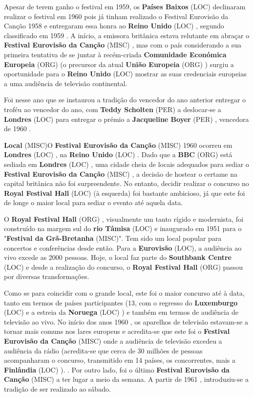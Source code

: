 \documentclass[12pt,a4paper]{article}
\begin{document}
Apesar de terem ganho o festival em 1959, os \textbf{Países Baixos} (LOC) declinaram realizar o festival em 1960 pois já tinham realizado o Festival Eurovisão da Canção 1958 e entregaram essa honra ao \textbf{Reino Unido} (LOC) , segundo classificado em 1959 . A início, a emissora britânica estava relutante em abraçar o \textbf{Festival Eurovisão da Canção} (MISC) , mas com o país considerando a sua primeira tentativa de se juntar à recém-criada \textbf{Comunidade Económica Europeia} (ORG) (o precursor da atual \textbf{União Europeia} (ORG) ) surgiu a oportunidade para o \textbf{Reino Unido} (LOC) mostrar as suas credenciais europeias a uma audiência de televisão continental.

Foi nesse ano que se instaurou a tradição do vencedor do ano anterior entregar o troféu ao vencedor do ano, com \textbf{Teddy Scholten} (PER) a deslocar-se a \textbf{Londres} (LOC) para entregar o prémio a \textbf{Jacqueline Boyer} (PER) , vencedora de 1960 .



\textbf{Local} (MISC)O \textbf{Festival Eurovisão da Canção} (MISC) 1960 ocorreu em \textbf{Londres} (LOC) , na \textbf{Reino Unido} (LOC) . Dado que a \textbf{BBC} (ORG) está sediada em \textbf{Londres} (LOC) , uma cidade cheia de locais adequados para sediar o \textbf{Festival Eurovisão da Canção} (MISC) , a decisão de hostear o certame na capital britânica não foi surpreendente. No entanto, decidir realizar o concurso no \textbf{Royal Festival Hall} (LOC) (à esquerda) foi bastante ambicioso, já que este foi de longe o maior local para sediar o evento até aquela data.

O \textbf{Royal Festival Hall} (ORG) , visualmente um tanto rígido e modernista, foi construído na margem sul do \textbf{rio Tâmisa} (LOC) e inaugurado em 1951 para o "\textbf{Festival da Grã-Bretanha} (MISC)". Tem sido um local popular para concertos e conferências desde então. Para a \textbf{Eurovisão} (LOC), a audiência ao vivo excede as 2000 pessoas. Hoje, o local faz parte do \textbf{Southbank Centre} (LOC) e desde a realização do concurso, o \textbf{Royal Festival Hall} (ORG) passou por diversas transformações.

Como se para coincidir com o grande local, este foi o maior concurso até à data, tanto em termos de países participantes (13, com o regresso do \textbf{Luxemburgo} (LOC) e a estreia da \textbf{Noruega} (LOC) ) e também em termos de audiência de televisão ao vivo. No início dos anos 1960 , os aparelhos de televisão estavam-se a tornar mais comuns nos lares europeus e acredita-se que este foi o \textbf{Festival Eurovisão da Canção} (MISC) onde a audiência de televisão excedeu a audiência da rádio (acredita-se que cerca de 30 milhões de pessoas acompanharam o concurso, transmitido em 14 países, os concorrentes, mais a \textbf{Finlândia} (LOC) ). . Por outro lado, foi o último \textbf{Festival Eurovisão da Canção} (MISC) a ter lugar a meio da semana. A partir de 1961 , introduziu-se a tradição de ser realizado ao sábado.
\end{document}

